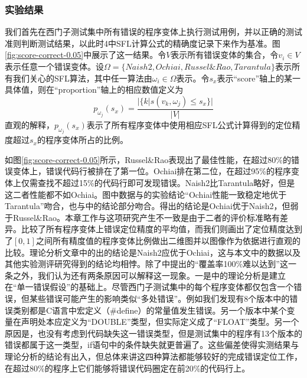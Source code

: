 \subsubsection{实验结果}
\label{subsection: compr result}
我们首先在西门子测试集中所有错误的程序变体上执行测试用例，并以正确的测试准则判断测试结果，以此时4中SFL计算公式的精确度记录下来作为基准。图\ref{fig:score-correct-0.05}中展示了这一结果。令$V$表示所有错误变体的集合，令$v_i \in V$表示任意一个错误变体。设$\Omega = \{Naish2, Ochiai, Russel\&Rao, Tarantula\}$表示所有我们关心的SFL算法，其中任一算法由$\omega_i\in \Omega$表示。令$s_x$表示“score”轴上的某一具体值，则在“proportion”轴上的相应数值定义为
$$
p_{\omega_j}(s_x) = \frac{|\{k|s(v_k, \omega_j) \le s_x\}|}{|V|}
$$
直观的解释，$p_{\omega_j}(s_x)$表示了所有程序变体中使用相应SFL公式计算得到的定位精度超过$s_x$的程序变体所占的比例。

如图\ref{fig:score-correct-0.05}所示，Russel\&Rao表现出了最佳性能，在超过80\%的错误变体上，错误代码行被排在了第一位。Ochiai排在第二位，在超过95\%的程序变体上仅需查找不超过15\%的代码行即可发现错误。Naish2比Tarantula略好，但是这二者性能都不如Ochiai。图中数据与\cite{4041886}的实验结论“Ochiai性能一致稳定地优于Tarantula”吻合，也与\cite{6676912}中的结论部分吻合。\cite{6676912}得出的结论是Ochiai优于Naish2，但弱于Russel\&Rao。本章工作与这项研究产生不一致是由于二者的评价标准略有差异。\cite{6676912}比较了所有程序变体上错误定位精度的平均值，而我们则画出了定位精度达到了$[0,1]$之间所有精度值的程序变体比例做出二维图并以图像作为依据进行直观的比较。理论分析文章\cite{xie2013theoretical}中的出的结论是Naish2应优于Ochiai，这与本文中的数据以及其他实验测评研究得到的结论均相悖。除了\cite{6676912}中提出的“覆盖率100\%难以达到”这一条之外，我们认为还有两条原因可以解释这一现象。一是\cite{xie2013theoretical}中的理论分析是建立在“单一错误假设”的基础上。尽管西门子测试集中的每个程序变体都仅包含一个错误，但某些错误可能产生的影响类似“多处错误”。例如我们发现有8个版本中的错误类别都是C语言中宏定义（\#define）的常量值发生错误。另一个版本中某个变量在声明处本应定义为“DOUBLE”类型，但实际定义成了“FLOAT”类型。另一个原因是，\cite{xie2013theoretical}也没有考虑到代码缺失这一错误类型，但是测试集中的程序有13个版本的错误都属于这一类型，if语句中的条件缺失就更普遍了。这些偏差使得实测结果与理论分析的结论有出入，但总体来讲这四种算法都能够较好的完成错误定位工作，在超过80\%的程序上它们能够将错误代码圈定在前20\%的代码行上。

